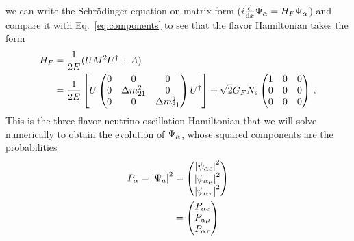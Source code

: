we can write the Schrödinger equation on matrix form ($i \dv{}{x}\Psi_\alpha = H_F \Psi_\alpha$) and compare it with Eq.~\ref{eq:components} to see that the flavor Hamiltonian takes the form 
\begin{align}\label{eq:H_3gen}
    H_F &= \frac{1}{2E}(U M^2 U^\dagger + A) \nonumber \\
        &= \frac{1}{2E}\left[U \begin{pmatrix}
            0 & 0 & 0 \\
            0 & \dm_{21} & 0 \\
            0 & 0 & \dm_{31}
        \end{pmatrix} U^\dagger\right] + \sqrt{2}G_F N_e \begin{pmatrix}
            1 & 0 & 0 \\
            0 & 0 & 0 \\
            0 & 0 & 0
        \end{pmatrix}\,. 
\end{align}%
This is the three-flavor neutrino oscillation Hamiltonian that we will solve numerically to obtain the evolution of $\Psi_\alpha$, whose squared components
are the probabilities
\begin{align}
    P_\alpha = \abs{\Psi_a}^2 &=\begin{pmatrix}
        \abs{\psi_{\alpha e}}^2 \\
        \abs{\psi_{\alpha \mu}}^{2} \\
        \abs{\psi_{\alpha \tau}}^{2}
    \end{pmatrix} \nonumber \\
    &=\begin{pmatrix}
        P_{\alpha e} \\
        P_{\alpha \mu} \\
        P_{\alpha \tau}
    \end{pmatrix} 
\end{align}

